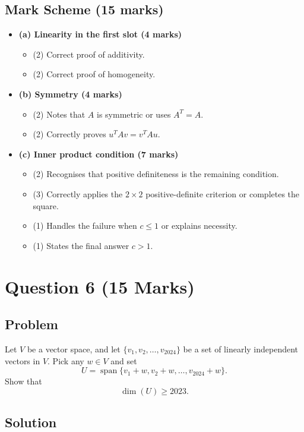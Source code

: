 \documentclass[12pt]{article}
\newcommand{\Span}{\operatorname{span}}
\begin{document}
\subsection{Mark Scheme (15 marks)}
\begin{itemize}[leftmargin=1.6em]
  \item \textbf{(a) Linearity in the first slot (4 marks)}
  \begin{itemize}[leftmargin=1.6em]
    \item (2) Correct proof of additivity.
    \item (2) Correct proof of homogeneity.
  \end{itemize}
  \item \textbf{(b) Symmetry (4 marks)}
  \begin{itemize}[leftmargin=1.6em]
    \item (2) Notes that $A$ is symmetric or uses $A^T=A$.
    \item (2) Correctly proves $u^TAv=v^TAu$.
  \end{itemize}
  \item \textbf{(c) Inner product condition (7 marks)}
  \begin{itemize}[leftmargin=1.6em]
    \item (2) Recognises that positive definiteness is the remaining condition.
    \item (3) Correctly applies the $2\times2$ positive-definite criterion or completes the square.
    \item (1) Handles the failure when $c\le1$ or explains necessity.
    \item (1) States the final answer $c>1$.
  \end{itemize}
\end{itemize}

\newpage
\section{Question 6 \hfill (15 Marks)}

\subsection{Problem}
Let $V$ be a vector space, and let $\{v_1,v_2,\ldots,v_{2024}\}$ be a set of linearly independent vectors in $V$. Pick any $w\in V$ and set
\[
U=\Span\{v_1+w,v_2+w,\ldots,v_{2024}+w\}.
\]
Show that
\[
\dim(U)\ge 2023.
\]

\subsection{Solution}
\end{document}

